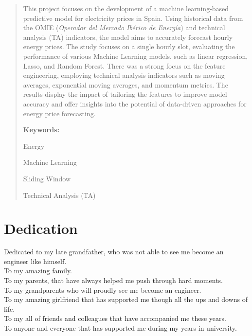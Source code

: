 \documentclass[12pt]{report} %
\begin{document}
\renewcommand\abstractname{\large\bfseries\filcenter\uppercase{Summary}}
\begin{abstract}
\thispagestyle{plain}
\setcounter{page}{3}
	
    This project focuses on the development of a machine learning-based predictive model for electricity prices in Spain. Using historical data from the OMIE (\textit{Operador del Mercado Ibérico de Energía}) and technical analysis (TA) indicators, the model aims to accurately forecast hourly energy prices. The study focuses on a single hourly slot, evaluating the performance of various Machine Learning models, such as linear regression, Lasso, and Random Forest. There was a strong focus on the feature engineering, employing technical analysis indicators such as moving averages, exponential moving averages, and momentum metrics. The results display the impact of tailoring the features to improve model accuracy and offer insights into the potential of data-driven approaches for energy price forecasting.

\bigskip
	\textbf{Keywords:} %
            
            Energy
            
            Machine Learning
            
            Sliding Window

            Technical Analysis (TA)

            
	
	\vfill
\end{abstract}



\newpage %
\thispagestyle{empty}
\mbox{}



\chapter*{Dedication}

\setcounter{page}{5}

\noindent Dedicated to my late grandfather, who was not able to see me become an engineer like himself.\\
To my amazing family.\\
To my parents, that have always helped me push through hard moments.\\
To my grandparents who will proudly see me become an engineer.\\
To my amazing girlfriend that has supported me though all the ups and downs of life.\\
To my all of friends and colleagues that have accompanied me these years.\\
To anyone and everyone that has supported me during my years in university.\\
\end{document}
